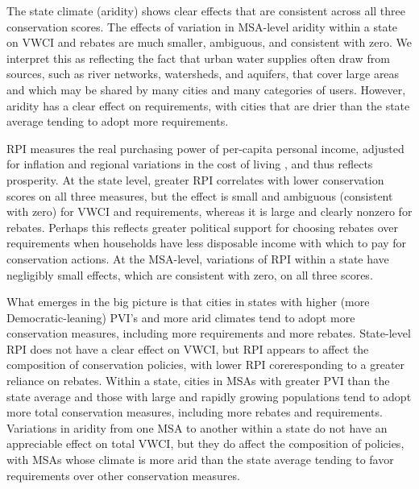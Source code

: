 \documentclass[draft,linenumbers]{agujournal}\usepackage{knitr}
\begin{document}
The state climate (aridity) shows clear effects that are consistent across all three conservation scores. The effects of variation in MSA-level aridity within a state on VWCI and rebates are much smaller, ambiguous, and consistent with zero. We interpret this as reflecting the fact that urban water supplies often draw from sources, such as river networks, watersheds, and aquifers, that cover large areas and which may be shared by many cities and many categories of users. However, aridity has a clear effect on requirements, with cities that are drier than the state average tending to adopt more requirements.

RPI measures the real purchasing power of per-capita personal income, adjusted for inflation and regional variations in the cost of living \citep{bea_rpp_methodology_2016}, and thus reflects prosperity. At the state level, greater RPI correlates with lower conservation scores on all three measures, but the effect is small and ambiguous (consistent with zero) for VWCI and requirements, whereas it is large and clearly nonzero for rebates. Perhaps this reflects greater political support for choosing rebates over requirements when households have less disposable income with which to pay for conservation actions. At the MSA-level, variations of RPI within a state have negligibly small effects, which are consistent with zero, on all three scores.

What emerges in the big picture is that cities in states with higher (more Democratic-leaning) PVI's and more arid climates tend to adopt more conservation measures, including more requirements and more rebates. State-level RPI does not have a clear effect on VWCI, but RPI appears to affect the composition of conservation policies, with lower RPI coreresponding to a greater reliance on rebates. Within a state, cities in MSAs with greater PVI than the state average and those with large and rapidly growing populations tend to adopt more total conservation measures, including more rebates and requirements. Variations in aridity from one MSA to another within a state do not have an appreciable effect on total VWCI, but they do affect the composition of policies, with MSAs whose climate is more arid than the state average tending to favor requirements over other conservation measures.
\end{document}
